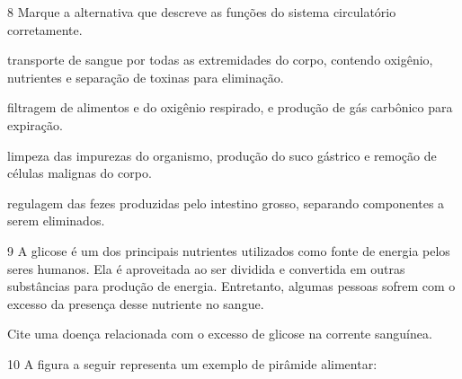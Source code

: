 \num{8} Marque a alternativa que descreve as funções do sistema circulatório corretamente.

\begin{escolha}
\item transporte de sangue por todas as extremidades do corpo, contendo
oxigênio, nutrientes e separação de toxinas para eliminação.

\item filtragem de alimentos e do oxigênio respirado, e produção de gás
carbônico para expiração.

\item limpeza das impurezas do organismo, produção do suco gástrico e
remoção de células malignas do corpo.

\item regulagem das fezes produzidas pelo intestino grosso, separando
componentes a serem eliminados.
\end{escolha}


\num{9} A glicose é um dos principais nutrientes utilizados como
fonte de energia pelos seres humanos. Ela é aproveitada ao ser dividida
e convertida em outras substâncias para produção de energia. Entretanto,
algumas pessoas sofrem com o excesso da presença desse nutriente no
sangue.

Cite uma doença relacionada com o excesso de glicose na corrente
sanguínea.



\num{10} A figura a seguir representa um exemplo de pirâmide
alimentar:

